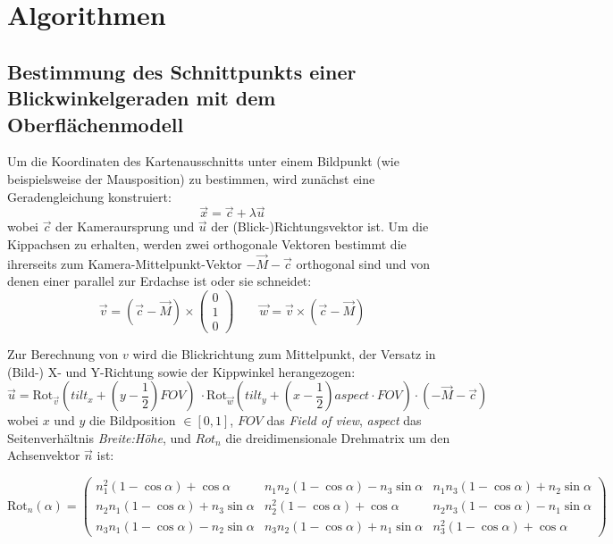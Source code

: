 \documentclass[10pt]{scrreprt}
\begin{document}


\chapter{Algorithmen}

\section{Bestimmung des Schnittpunkts einer Blickwinkelgeraden mit dem Oberflächenmodell}
Um die Koordinaten des Kartenausschnitts unter einem Bildpunkt (wie beispielsweise der Mausposition) zu bestimmen, wird zunächst eine Geradengleichung konstruiert:
\[\vec{x} = \vec{c}+\lambda\vec{u}\]
wobei $\vec{c}$ der Kameraursprung und $\vec{u}$ der (Blick-)Richtungsvektor ist. Um die Kippachsen zu erhalten, werden zwei orthogonale Vektoren bestimmt die ihrerseits zum Kamera-Mittelpunkt-Vektor $-\vec{M}-\vec{c}$ orthogonal sind und von denen einer parallel zur Erdachse ist oder sie schneidet:
\[\vec{v} = (\vec{c}-\vec{M})\times\left(\begin{array}{c}0\\1\\0\end{array}\right)\qquad \vec{w} = \vec{v}\times (\vec{c}-\vec{M})\]


Zur Berechnung von $v$ wird die Blickrichtung zum Mittelpunkt, der Versatz in (Bild-) X- und Y-Richtung sowie der Kippwinkel herangezogen:
\[\vec{u}=\mathrm{Rot}_{\vec{v}}\left(tilt_x+\left(y-\frac{1}{2}\right)FOV\right)\ \cdot \mathrm{Rot}_{\vec{w}}\left(tilt_y+\left(x-\frac{1}{2}\right)aspect\cdot FOV\right)\cdot (-\vec{M}-\vec{c})\]
wobei $x$ und $y$ die Bildposition $\in [0, 1]$, $FOV$ das \textit{Field of view}, \textit{aspect} das Seitenverhältnis \textit{Breite:Höhe}, und $Rot_n$ die dreidimensionale Drehmatrix um den Achsenvektor $\vec{n}$ ist:

\[\mathrm{Rot}_n(\alpha) = 
\begin{pmatrix}
n_1^2(1-\cos\alpha)+\cos\alpha	& 	n_1n_2(1-\cos\alpha)-n_3\sin\alpha	& 	n_1n_3(1-\cos\alpha)+n_2\sin\alpha\\
n_2n_1(1-\cos\alpha)+n_3\sin\alpha	& 	n_2^2(1-\cos\alpha)+\cos\alpha	& 	n_2n_3(1-\cos\alpha)-n_1\sin\alpha\\
n_3n_1(1-\cos\alpha)-n_2\sin\alpha	& 	n_3n_2(1-\cos\alpha)+n_1\sin\alpha	&	n_3^2(1-\cos\alpha)+\cos\alpha
\end{pmatrix}\]
\end{document}
